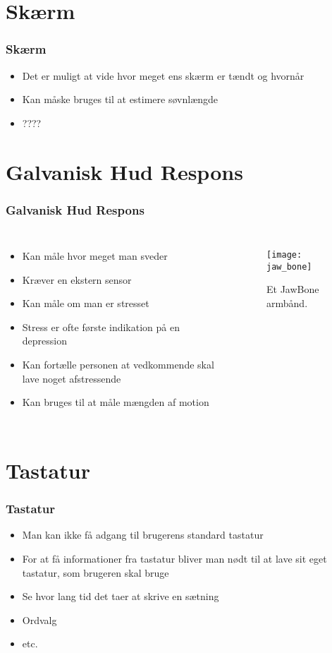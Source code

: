 \section{Skærm}
\begin{frame}
\frametitle{Skærm}
\begin{itemize}
\item Det er muligt at vide hvor meget ens skærm er tændt og hvornår
\item Kan måske bruges til at estimere søvnlængde
\item ????
\end{itemize}
\end{frame}


\section{Galvanisk Hud Respons}
\begin{frame}
\frametitle{Galvanisk Hud Respons}
\begin{columns}
\column[t]{5cm}
\begin{itemize}
\item Kan måle hvor meget man sveder
\item Kræver en ekstern sensor
\item Kan måle om man er stresset
\item Stress er ofte første indikation på en depression
\item Kan fortælle personen at vedkommende skal lave noget afstressende
\item Kan bruges til at måle mængden af motion
\end{itemize}
\column[t]{5cm}
\begin{figure}
\texttt{[image: jaw\_bone]}
\caption{Et JawBone armbånd.}
\end{figure}
\end{columns}
\end{frame}


\section{Tastatur}
\begin{frame}
\frametitle{Tastatur}
\begin{itemize}
\item Man kan ikke få adgang til brugerens standard tastatur
\item For at få informationer fra tastatur bliver man nødt til at lave sit eget tastatur, som brugeren skal bruge
\item Se hvor lang tid det taer at skrive en sætning
\item Ordvalg
\item etc.
\end{itemize}
\end{frame}

